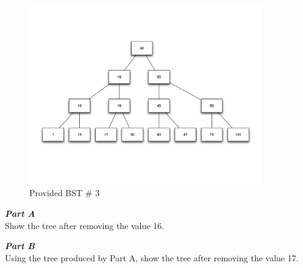 \documentclass[letter,11pt]{scrartcl}
\begin{document}
\begin{figure}[H]
  \centering
  \includegraphics[width=0.9\textwidth]{provided_3}
  \caption{Provided BST \# 3}
\end{figure}

\large{\textbf{\emph{Part A}}} \\
Show the tree after removing the value 16.


\large{\textbf{\emph{Part B}}} \\
Using the tree produced by Part A, show the tree after removing the value 17.


\end{document}
